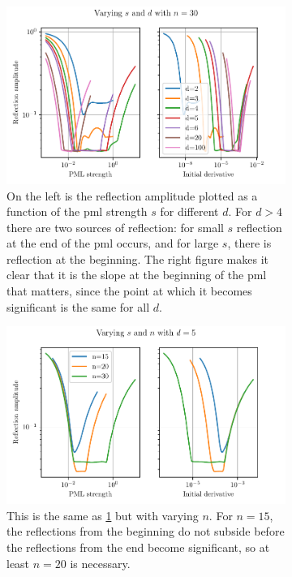 \begin{figure}[htpb]
	\centering
	\begin{subfigure}[]{0.99\textwidth}
	\begin{center}
		\includegraphics{chapters/results/pml_sweep_sd.pdf}
	\end{center}
	\caption{
		On the left is the reflection amplitude plotted as a function of the
		\gls{pml} strength $s$ for different $d$.
		For $d > 4$ there are two sources of reflection:
		for small $s$ reflection at the end of the \gls{pml} occurs,
		and for large $s$, there is reflection at the beginning.
		The right figure makes it clear that it is the slope at the beginning of
		the \gls{pml} that matters, since the point at which it becomes
		significant is the same for all $d$.
	}
	\label{fig:pml_sweep_sd}
	\end{subfigure}%

	\begin{subfigure}[]{0.99\textwidth}
	\begin{center}
		\includegraphics{chapters/results/pml_sweep_sn.pdf}
	\end{center}
	\caption{
		This is the same as \cref{fig:pml_sweep_sd} but with varying $n$.
		For $n=15$, the reflections from the beginning do not subside before the
		reflections from the end become significant, so at least $n=20$ is
		necessary.
	}
	\label{fig:pml_sweep_sn}
	\end{subfigure}
	\caption{}
	\label{fig:pml_sweep1}
\end{figure}


